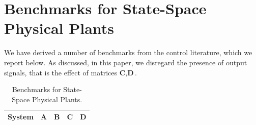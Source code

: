 \documentclass[runningheads,a4paper]{llncs}
\begin{document}
\newpage

\section{Benchmarks for State-Space Physical Plants}
\label{sec:BenchmarksforStateSpace}

We have derived a number of benchmarks from the control literature, which we report below. 
As discussed, in this paper, we disregard the presence of output signals, that is the effect of matrices $\textbf{C}, \textbf{D}$. 
%

\begin{table}[htb]
\centering
\footnotesize
\caption{Benchmarks for State-Space Physical Plants.}
\label{table:State-space-benchmarks}
\begin{tabular}{|c|c|c|c|c|}
\hline
\textbf{System}                                                               & \textbf{A} & \textbf{B} & \textbf{C} & \textbf{D} \\ \hline

\end{tabular}
\end{table}
\end{document}
